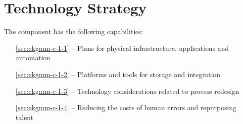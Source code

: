 \chapter{Technology Strategy}\label{ch:ekgmm-c-1}

The  component has the following capabilities:

\begin{itemize}[leftmargin=.5in]
  \item [\ref{sec:ekgmm-c-1-1}]  -- Plans for physical infrastructure, applications and automation
  \item [\ref{sec:ekgmm-c-1-2}]  -- Platforms and tools for storage and integration
  \item [\ref{sec:ekgmm-c-1-3}]  -- Technology considerations related to process redesign
  \item [\ref{sec:ekgmm-c-1-4}]  -- Reducing the costs of human errors and repurposing talent
\end{itemize}





